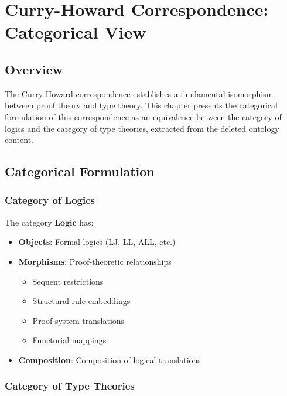 
\chapter*{Curry-Howard Correspondence: Categorical View}

\section*{Overview}

The Curry-Howard correspondence establishes a fundamental isomorphism between proof theory and type theory. This chapter presents the categorical formulation of this correspondence as an equivalence between the category of logics and the category of type theories, extracted from the deleted ontology content.

\section*{Categorical Formulation}

\subsection*{Category of Logics}

The category $\mathbf{Logic}$ has:
\begin{itemize}
    \item \textbf{Objects}: Formal logics (LJ, LL, ALL, etc.)
    \item \textbf{Morphisms}: Proof-theoretic relationships
    \begin{itemize}
        \item Sequent restrictions
        \item Structural rule embeddings
        \item Proof system translations
        \item Functorial mappings
    \end{itemize}
    \item \textbf{Composition}: Composition of logical translations
\end{itemize}

\subsection*{Category of Type Theories}


